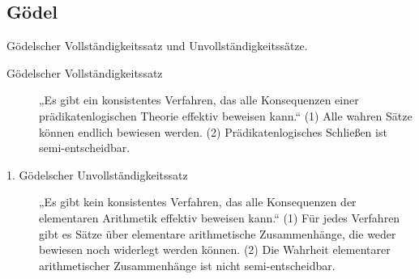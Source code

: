 \subsection{Gödel}
    Gödelscher Vollständigkeitssatz und Unvollständigkeitssätze.  
    \begin{description}
        \item[Gödelscher Vollständigkeitssatz] „Es gibt ein konsistentes Verfahren, das alle Konsequenzen einer prädikatenlogischen Theorie effektiv beweisen kann.“ (1) Alle wahren Sätze können endlich bewiesen werden. (2) Prädikatenlogisches Schließen ist semi-entscheidbar.
        \item[1. Gödelscher Unvollständigkeitssatz] „Es gibt kein konsistentes Verfahren, das alle Konsequenzen der elementaren Arithmetik effektiv beweisen kann.“ (1) Für jedes Verfahren gibt es Sätze über elementare arithmetische Zusammenhänge, die weder bewiesen noch widerlegt werden können. (2) Die Wahrheit elementarer arithmetischer Zusammenhänge ist nicht semi-entscheidbar.
    \end{description}


